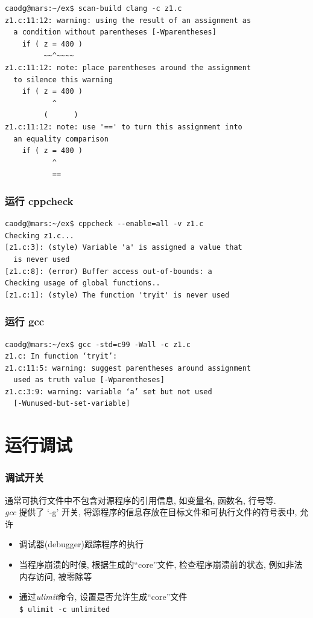 \documentclass[compress]{beamer}
\begin{document}
\begin{frame}[fragile]
\footnotesize
\begin{Verbatim}
caodg@mars:~/ex$ scan-build clang -c z1.c
z1.c:11:12: warning: using the result of an assignment as 
  a condition without parentheses [-Wparentheses]
    if ( z = 400 )
         ~~^~~~~
z1.c:11:12: note: place parentheses around the assignment 
  to silence this warning
    if ( z = 400 )
           ^
         (      )
z1.c:11:12: note: use '==' to turn this assignment into 
  an equality comparison
    if ( z = 400 )
           ^
           ==
\end{Verbatim}
\end{frame}

\begin{frame}[fragile]
\frametitle{运行 cppcheck}
\begin{Verbatim}
caodg@mars:~/ex$ cppcheck --enable=all -v z1.c
Checking z1.c...
[z1.c:3]: (style) Variable 'a' is assigned a value that 
  is never used
[z1.c:8]: (error) Buffer access out-of-bounds: a
Checking usage of global functions..
[z1.c:1]: (style) The function 'tryit' is never used
\end{Verbatim}
\end{frame}

\begin{frame}[fragile]
\frametitle{运行 gcc}
\begin{Verbatim}
caodg@mars:~/ex$ gcc -std=c99 -Wall -c z1.c
z1.c: In function ‘tryit’:
z1.c:11:5: warning: suggest parentheses around assignment 
  used as truth value [-Wparentheses]
z1.c:3:9: warning: variable ‘a’ set but not used 
  [-Wunused-but-set-variable]
\end{Verbatim}
\end{frame}

\section{运行调试}

\begin{frame}[fragile]
\frametitle{调试开关}

通常可执行文件中不包含对源程序的引用信息, 如变量名, 函数名, 行号等.\\
\emph{gcc} 提供了 `-g' 开关, 将源程序的信息存放在目标文件和可执行文件的符号表中, 允许
\begin{itemize}
\item 调试器(debugger)跟踪程序的执行
\item 当程序崩溃的时候, 根据生成的``core''文件, 检查程序崩溃前的状态,
例如非法内存访问, 被零除等
\item 通过\emph{ulimit}命令, 设置是否允许生成``core''文件\\
\verb~$ ulimit -c unlimited~
\end{itemize}
\end{frame}
\end{document}
